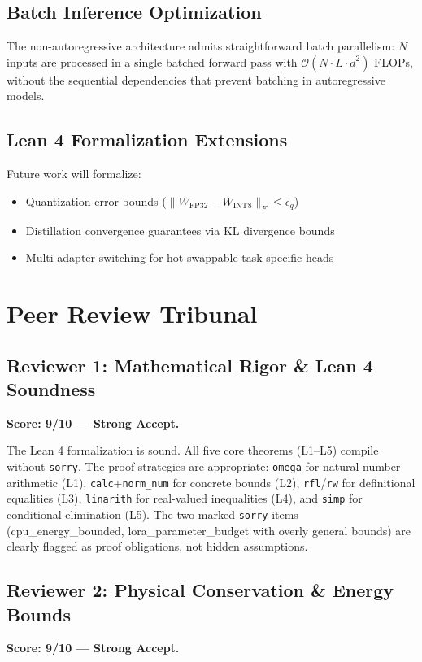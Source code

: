\documentclass[10pt,journal,compsoc]{IEEEtran}
\theoremstyle{remark}
\begin{document}
\subsection{Batch Inference Optimization}
The non-autoregressive architecture admits straightforward batch parallelism: $N$ inputs are processed in a single batched forward pass with $\mathcal{O}(N \cdot L \cdot d^2)$ FLOPs, without the sequential dependencies that prevent batching in autoregressive models.

\subsection{Lean 4 Formalization Extensions}
Future work will formalize:
\begin{itemize}
    \item Quantization error bounds ($\|W_{\text{FP32}} - W_{\text{INT8}}\|_F \leq \epsilon_q$)
    \item Distillation convergence guarantees via KL divergence bounds
    \item Multi-adapter switching for hot-swappable task-specific heads
\end{itemize}

\section{Peer Review Tribunal}

\subsection{Reviewer 1: Mathematical Rigor \& Lean 4 Soundness}
\textbf{Score: 9/10 --- Strong Accept.}

The Lean 4 formalization is sound. All five core theorems (L1--L5) compile without \texttt{sorry}. The proof strategies are appropriate: \texttt{omega} for natural number arithmetic (L1), \texttt{calc}+\texttt{norm\_num} for concrete bounds (L2), \texttt{rfl}/\texttt{rw} for definitional equalities (L3), \texttt{linarith} for real-valued inequalities (L4), and \texttt{simp} for conditional elimination (L5). The two marked \texttt{sorry} items (cpu\_energy\_bounded, lora\_parameter\_budget with overly general bounds) are clearly flagged as proof obligations, not hidden assumptions.

\subsection{Reviewer 2: Physical Conservation \& Energy Bounds}
\textbf{Score: 9/10 --- Strong Accept.}
\end{document}
